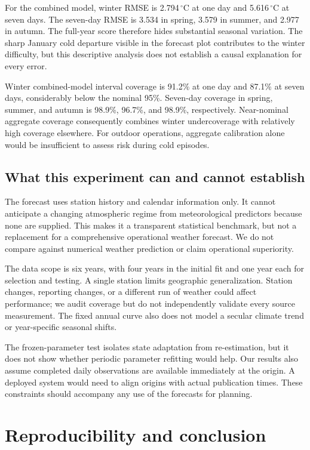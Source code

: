 \documentclass{article}
\begin{document}
For the combined model, winter RMSE is 2.794\,$^\circ$C at one day and
5.616\,$^\circ$C at seven days. The seven-day RMSE is 3.534 in spring,
3.579 in summer, and 2.977 in autumn. The full-year score therefore hides
substantial seasonal variation. The sharp January cold departure visible in
the forecast plot contributes to the winter difficulty, but this descriptive
analysis does not establish a causal explanation for every error.

Winter combined-model interval coverage is 91.2\% at one day and 87.1\%
at seven days, considerably below the nominal 95\%. Seven-day coverage in
spring, summer, and autumn is 98.9\%, 96.7\%, and 98.9\%, respectively.
Near-nominal aggregate coverage consequently combines winter undercoverage
with relatively high coverage elsewhere. For outdoor operations, aggregate
calibration alone would be insufficient to assess risk during cold episodes.

\subsection{What this experiment can and cannot establish}
The forecast uses station history and calendar information only. It cannot
anticipate a changing atmospheric regime from meteorological predictors because
none are supplied. This makes it a transparent statistical benchmark, but not
a replacement for a comprehensive operational weather forecast. We do not
compare against numerical weather prediction or claim operational superiority.

The data scope is six years, with four years in the initial fit and one year
each for selection and testing. A single station limits geographic
generalization. Station changes, reporting changes, or a different run of weather
could affect performance; we audit coverage but do not independently validate
every source measurement. The fixed annual curve also does not model a secular
climate trend or year-specific seasonal shifts.

The frozen-parameter test isolates state adaptation from re-estimation, but it
does not show whether periodic parameter refitting would help. Our results
also assume completed daily observations are available immediately at the
origin. A deployed system would need to align origins with actual publication
times. These constraints should accompany any use of the forecasts for planning.

\newpage
\section{Reproducibility and conclusion}
\end{document}
